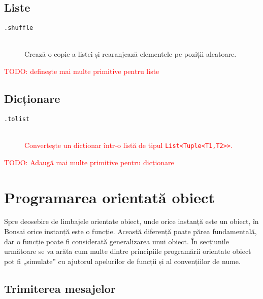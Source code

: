 \documentclass[12pt,a4paper]{memoir}
\newcommand{\draft}{\textcolor{red}}
\renewcommand{\c}{\texttt}
\begin{document}
\section{Liste}

\begin{description}
\item[\c{.shuffle}]\hfill\\Crează o copie a listei și rearanjează elementele pe poziții aleatoare.
\end{description}

\draft{TODO: definește mai multe primitive pentru liste}

\section{Dicționare}

\begin{description}
\item[\c{.tolist}]\hfill\\\draft{Convertește un dicționar într-o listă de tipul \c{List<Tuple<T1,T2>>}.}
\end{description}

\draft{TODO: Adaugă mai multe primitive pentru dicționare}

\chapter{Programarea orientată obiect}\label{ch:oop}

Spre deosebire de limbajele orientate obiect, unde orice instanță este un obiect, în Bonsai orice instanță este o funcție. Această diferență poate părea fundamentală, dar o funcție poate fi considerată generalizarea unui obiect. În secțiunile următoare se va arăta cum multe dintre principiile programării orientate obiect pot fi „simulate” cu ajutorul apelurilor de funcții și al convențiilor de nume.

\section{Trimiterea mesajelor}
\end{document}
